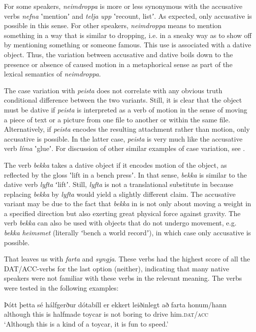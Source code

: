 \documentclass[output=paper,modfonts,nonflat]{langsci/langscibook}
\begin{document}
For some speakers, \textit{neimdroppa} is more or less synonymous with the accusative verbs \textit{nefna} ʽmentionʼ and \textit{telja} \textit{upp} ʽrecount, listʼ. As expected, only accusative is possible in this sense. For other speakers,  \textit{neimdroppa} means to mention something in a way that is similar to dropping, i.e. in a sneaky way as to show off by mentioning something or someone famous. This use is associated with a dative object. Thus, the variation between accusative and dative boils down to the presence or absence of caused motion in a metaphorical sense as part of the lexical semantics of \textit{neimdroppa}.

The case variation with \textit{peista} does not correlate with any obvious truth conditional difference between the two variants. Still, it is clear that the object must be dative if \textit{peista} is interpreted as a verb of motion in the sense of moving a piece of text or a picture from one file to another or within the same file. Alternatively, if \textit{peista} encodes the resulting attachment rather than motion, only accusative is possible. In the latter case, \textit{peista} is very much like the accusative verb \textit{líma} ʽglueʼ. For discussion of other similar examples of case variation, see \citet{Jónsson2013a}.

The verb \textit{bekka} takes a dative object if it encodes motion of the object, as reflected by the gloss ʽlift in a bench pressʼ. In that sense, \textit{bekka} is similar to the dative verb \textit{lyfta} ʻliftʼ. Still, \textit{lyfta} is not a translational substitute in  because replacing \textit{bekka} by \textit{lyfta} would yield a slightly different claim. The accusative variant may be due to the fact that \textit{bekka} in  is not only about moving a weight in a specified direction but also exerting great physical force against gravity. The verb \textit{bekka} can also be used with objects that do not undergo movement, e.g. \textit{bekka} \textit{heimsmet} (literally ʻbench a world recordʼ), in which case only accusative is possible. 

That leaves us with \textit{farta} and \textit{syngja}. These verbs had the highest score of all the DAT/ACC-verbs for the last option (neither), indicating that many native speakers were not familiar with these verbs in the relevant meaning. The verbs were tested in the following examples: 


\ea
    \label{ex:jonsson:8}
\ea%
\gll  Þótt  þetta  sé  hálfgerður  dótabíll  er  ekkert  leiðinlegt  að  farta  honum/hann\\
   although  this  is  halfmade  toycar  is  not  boring  to  drive  him.\textsc{dat/acc}\\
\glt `Although this is a kind of a toycar, it is fun to speed.'
\end{document}
